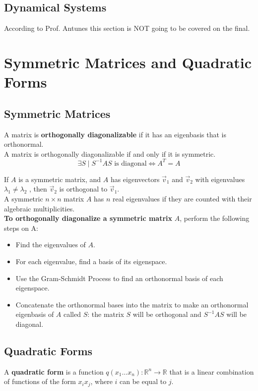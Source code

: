 \documentclass[]{scrartcl}
\begin{document}
	\subsection{Dynamical Systems}
	According to Prof. Antunes this section is NOT going to be covered on the final.
	
	\setcounter{section}{7}
	\section{Symmetric Matrices and Quadratic Forms}
	\subsection{Symmetric Matrices}
	A matrix is \textbf{orthogonally diagonalizable} if it has an eigenbasis that is orthonormal.\\
	
	 A matrix is orthogonally diagonalizable if and only if it is symmetric.
	$$
	\exists S \mid S^{-1}AS \text{ is diagonal} \iff A^T = A 
	$$
	
	 If $A$ is a symmetric matrix, and $A$ has eigenvectors $\vec{v}_1$ and $\vec{v}_2$ with eigenvalues $\lambda_1 \neq \lambda_2$ , then $\vec{v}_2$ is orthogonal to $\vec{v}_1$.\\
	
	 A symmetric $n \times n$ matrix $A$ has $n$ real eigenvalues if they are counted with their algebraic multiplicities.\\
	 
	 \textbf{To orthogonally diagonalize a symmetric matrix} $A$, perform the following steps on A:
	 \begin{itemize}
	 	\item Find the eigenvalues of $A$.
	 	\item For each eigenvalue, find a basis of its eigenspace.
	 	\item Use the Gram-Schmidt Process to find an orthonormal basis of each eigenspace.
	 	\item Concatenate the orthonormal bases into the matrix to make an orthonormal eigenbasis of $A$ called $S$: the matrix $S$ will be orthogonal and $S^{-1}AS$ will be diagonal.
	 \end{itemize}
	
	\subsection{Quadratic Forms}
	A \textbf{quadratic form} is a function $q(x_1 \ldots x_n): \mathbb{R}^n \rightarrow \mathbb{R}$ that is a linear combination of functions of the form $x_i x_j$, where $i$ can be equal to $j$.\\
	
\end{document}
